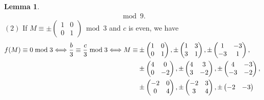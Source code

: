 \documentclass[12pt]{article}
\theoremstyle{definition}
\newtheorem{lemma}[theorem]{Lemma}
\numberwithin{equation}{section}
\numberwithin{theorem}{section}
\begin{document}
\begin{lemma}
{\begin{align*}
\bmod{9}.   %
\end{align*}
$\mathrm{(2)}$ If 
$
M
\equiv
\pm
\begin{pmatrix}
1 & 0 \\
0 & 1
\end{pmatrix}
\bmod{3}
$ 
and $c$ is even, 
we have 
\begin{align*}
f(M)\equiv 0 \bmod{3} 
\Longleftrightarrow
\frac{b}{3} \equiv \frac{c}{3} \bmod{3}
\Longleftrightarrow
M
\equiv& 
\pm
\begin{pmatrix}
1 & 0 \\
0 & 1
\end{pmatrix}, 
\pm
\begin{pmatrix}
1 & 3 \\
3 & 1
\end{pmatrix}, 
\pm
\begin{pmatrix}
1 & -3 \\
-3 & 1
\end{pmatrix},  \notag \\
&
\pm
\begin{pmatrix}
4 & 0 \\
0 & -2
\end{pmatrix},  
\pm
\begin{pmatrix}
4 & 3 \\
3 & -2
\end{pmatrix}, 
\pm
\begin{pmatrix}
4 & -3 \\
-3 & -2
\end{pmatrix}, \notag \\
&
\pm
\begin{pmatrix}
-2 & 0 \\
0 & 4
\end{pmatrix}, 
\pm
\begin{pmatrix}
-2 & 3 \\
3 & 4
\end{pmatrix}, 
\pm
\begin{pmatrix}
-2 & -3 \\

\end{pmatrix}
\end{align*}}
\end{lemma}
\end{document}

